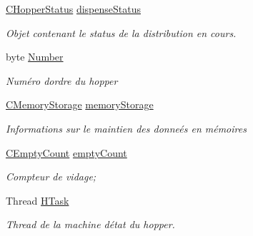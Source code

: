 \begin{DoxyCompactItemize}
\mbox{\hyperlink{class_device_library_1_1_c_hopper_1_1_c_hopper_status}{C\+Hopper\+Status}} \mbox{\hyperlink{class_device_library_1_1_c_hopper_ab1706fc6c299ceacbbc2d16a11229f41}{dispense\+Status}}
\begin{DoxyCompactList}\small\item\em Objet contenant le status de la distribution en cours. \end{DoxyCompactList}\item 
byte \mbox{\hyperlink{class_device_library_1_1_c_hopper_af41c804396bf26e0d2275a1d90f763e2}{Number}}
\begin{DoxyCompactList}\small\item\em Numéro d\textquotesingle{}ordre du hopper \end{DoxyCompactList}\item 
\mbox{\hyperlink{class_device_library_1_1_c_memory_storage}{C\+Memory\+Storage}} \mbox{\hyperlink{class_device_library_1_1_c_hopper_a3896efcc3ac63f3c01d3871d8f74881d}{memory\+Storage}}
\begin{DoxyCompactList}\small\item\em Informations sur le maintien des donneés en mémoires \end{DoxyCompactList}\item 
\mbox{\hyperlink{class_device_library_1_1_c_hopper_1_1_c_empty_count}{C\+Empty\+Count}} \mbox{\hyperlink{class_device_library_1_1_c_hopper_aa38216ffa60bf350c59c59af0de3fa7b}{empty\+Count}}
\begin{DoxyCompactList}\small\item\em Compteur de vidage; \end{DoxyCompactList}\item 
Thread \mbox{\hyperlink{class_device_library_1_1_c_hopper_acfcffc972c7e842f7bf34140fd320a27}{H\+Task}}
\begin{DoxyCompactList}\small\item\em Thread de la machine d\textquotesingle{}état du hopper. \end{DoxyCompactList}\end{DoxyCompactItemize}
